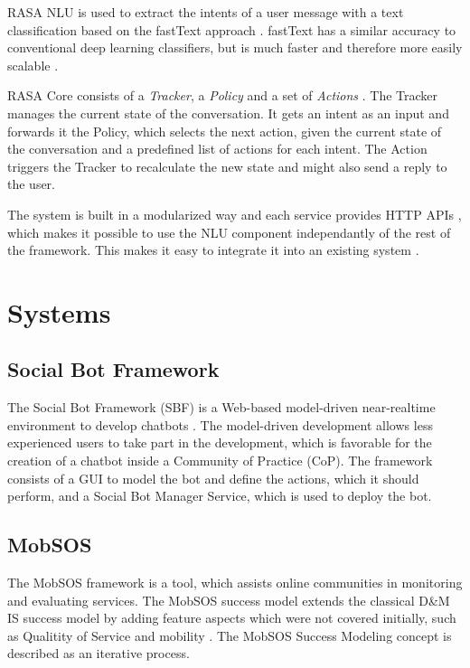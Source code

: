 RASA NLU is used to extract the intents of a user message with a text classification based on the fastText approach \cite{BFPN17}. fastText has a similar accuracy to conventional deep learning classifiers, but is much faster and therefore more easily scalable \cite{JGBM16}.

RASA Core consists of a \emph{Tracker}, a \emph{Policy} and a set of \emph{Actions} \cite{BFPN17}. The Tracker manages the current state of the conversation. It gets an intent as an input and forwards it the Policy, which selects the next action, given the current state of the conversation and a predefined list of actions for each intent. The Action triggers the Tracker to recalculate the new state and might also send a reply to the user.

The system is built in a modularized way and each service provides HTTP APIs \cite{BFPN17}, which makes it possible to use the NLU component independantly of the rest of the framework. This makes it easy to integrate it into an existing system \cite{RaKe19}.

\section{Systems} \label{lab:systems}

\subsection{Social Bot Framework}

The Social Bot Framework (SBF) is a Web-based model-driven near-realtime environment to develop chatbots \cite{NLKl19}. The model-driven development allows less experienced users to take part in the development, which is favorable for the creation of a chatbot inside a Community of Practice (CoP). The framework consists of a GUI to model the bot and define the actions, which it should perform, and a Social Bot Manager Service, which is used to deploy the bot.

\subsection{MobSOS}
The MobSOS framework is a tool, which assists online communities in monitoring and evaluating services. The MobSOS success model extends the classical D\&M IS success model by adding feature aspects which were not covered initially, such as Qualitity of Service and mobility \cite{Renz08}.
The MobSOS Success Modeling concept is described as an iterative process.

